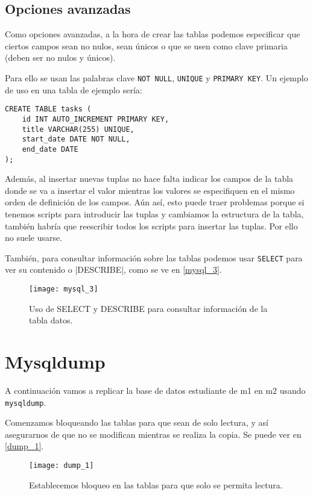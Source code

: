 \section{Opciones avanzadas}

Como opciones avanzadas, a la hora de crear las tablas podemos especificar que ciertos campos sean no nulos, sean únicos o que se usen como clave primaria (deben ser no nulos y únicos).

Para ello se usan las palabras clave \verb|NOT NULL|, \verb|UNIQUE| y \verb|PRIMARY KEY|. Un ejemplo de uso en una tabla de ejemplo sería:

\begin{verbatim}
CREATE TABLE tasks (
    id INT AUTO_INCREMENT PRIMARY KEY,
    title VARCHAR(255) UNIQUE,
    start_date DATE NOT NULL,
    end_date DATE
);
\end{verbatim}

Además, al insertar nuevas tuplas no hace falta indicar los campos de la tabla donde se va a insertar el valor mientras los valores se especifiquen en el mismo orden de definición de los campos. Aún así, esto puede traer problemas porque si tenemos scripts para introducir las tuplas y cambiamos la estructura de la tabla, también habría que reescribir todos los scripts para insertar las tuplas. Por ello no suele usarse.

También, para consultar información sobre las tablas podemos usar \verb|SELECT| para ver su contenido o |DESCRIBE|, como se ve en \eqref{mysql_3}.

\begin{figure}[h!]
\begin{center}
\caption{Uso de SELECT y DESCRIBE para consultar información de la tabla datos.}
\label{mysql_3}
\texttt{[image: mysql\_3]}
\end{center}
\end{figure}

\chapter{Mysqldump}

A continuación vamos a replicar la base de datos estudiante de m1 en m2 usando \verb|mysqldump|.

Comenzamos bloqueando las tablas para que sean de solo lectura, y así asegurarnos de que no se modifican mientras se realiza la copia. Se puede ver en \eqref{dump_1}.

\begin{figure}[h!]
\begin{center}
\caption{Establecemos bloqueo en las tablas para que solo se permita lectura.}
\label{dump_1}
\texttt{[image: dump\_1]}
\end{center}
\end{figure}

